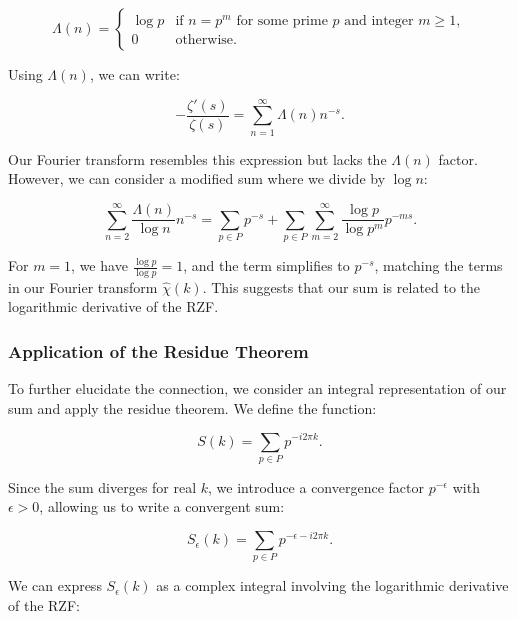 \documentclass[11pt, oneside]{article}
\begin{document}
\begin{equation}
\Lambda(n) = \begin{cases}
\log p & \text{if } n = p^m \text{ for some prime } p \text{ and integer } m \geq 1, \\
0 & \text{otherwise}.
\end{cases}
\end{equation}

Using $\Lambda(n)$, we can write:

\begin{equation}
-\frac{\zeta'(s)}{\zeta(s)} = \sum_{n=1}^\infty \Lambda(n) n^{-s}.
\end{equation}

Our Fourier transform resembles this expression but lacks the $\Lambda(n)$ factor. However, we can consider a modified sum where we divide by $\log n$:

\begin{equation}
\sum_{n=2}^\infty \frac{\Lambda(n)}{\log n} n^{-s} = \sum_{p \in P} p^{-s} + \sum_{p \in P} \sum_{m=2}^\infty \frac{\log p}{\log p^m} p^{-m s}.
\end{equation}

For $m = 1$, we have $\frac{\log p}{\log p} = 1$, and the term simplifies to $p^{-s}$, matching the terms in our Fourier transform $\hat{\chi}(k)$. This suggests that our sum is related to the logarithmic derivative of the RZF.

\subsubsection{Application of the Residue Theorem}

To further elucidate the connection, we consider an integral representation of our sum and apply the residue theorem. We define the function:

\begin{equation}
S(k) = \sum_{p \in P} p^{-i 2\pi k}.
\end{equation}

Since the sum diverges for real $k$, we introduce a convergence factor $p^{-\epsilon}$ with $\epsilon > 0$, allowing us to write a convergent sum:

\begin{equation}
S_\epsilon(k) = \sum_{p \in P} p^{- \epsilon - i 2\pi k}.
\end{equation}

We can express $S_\epsilon(k)$ as a complex integral involving the logarithmic derivative of the RZF:
\end{document}
